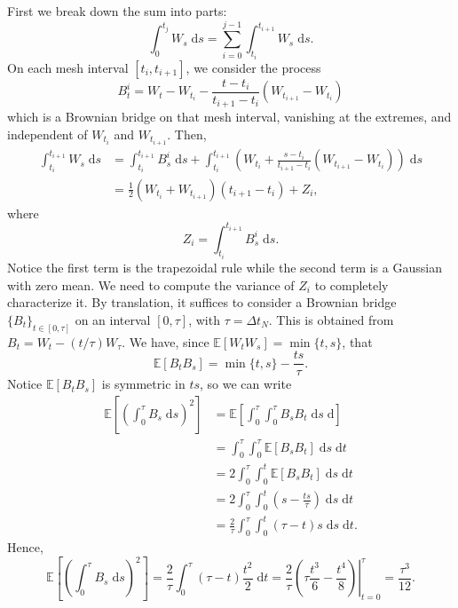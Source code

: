 \documentclass[reqno,12pt]{amsart}
\theoremstyle{plain}%
\theoremstyle{definition}
\begin{document}
First we break down the sum into parts:
\begin{equation}
    \int_0^{t_j} W_s\;\mathrm{d}s = \sum_{i = 0}^{j-1} \int_{t_i}^{t_{i+1}} W_s\;\mathrm{d}s.
\end{equation}
On each mesh interval $[t_i, t_{i+1}]$, we consider the process
\begin{equation}
    B_t^i = W_t - W_{t_i} - \frac{t - t_i}{t_{i+1}-t_i}(W_{t_{i+1}} - W_{t_i})
\end{equation}
which is a Brownian bridge on that mesh interval, vanishing at the extremes, and  independent of $W_{t_i}$ and $W_{t_{i+1}}$. Then,
\begin{align*}
    \int_{t_i}^{t_{i+1}} W_s\;\mathrm{d}s & = \int_{t_i}^{t_{i+1}} B_s^i\;\mathrm{d}s + \int_{t_i}^{t_{i+1}} \left( W_{t_i} + \frac{s - t_i}{t_{i+1}-t_i}(W_{t_{i+1}} - W_{t_i})\right)\;\mathrm{d}s \\
    & = \frac{1}{2}\left(W_{t_i} + W_{t_{i+1}}\right)(t_{i+1} - t_i) + Z_i,
\end{align*}
where
\begin{equation}
    Z_i = \int_{t_i}^{t_{i+1}} B_s^i\;\mathrm{d}s.
\end{equation}
Notice the first term is the trapezoidal rule while the second term is a Gaussian with zero mean. We need to compute the variance of $Z_i$ to completely characterize it. By translation, it suffices to consider a Brownian bridge $\{B_t\}_{t\in [0, \tau]}$ on an interval $[0, \tau]$, with $\tau = \Delta t_N$. This is obtained from $B_t = W_t - (t/\tau)W_\tau$. We have, since $\mathbb{E}[W_tW_s] = \min\{t, s\}$, that
\[
    \mathbb{E}[B_tB_s] = \min\{t, s\} - \frac{ts}{\tau}.
\]
Notice $\mathbb{E}[B_tB_s]$ is symmetric in $ts$, so we can write
\begin{align*}
    \mathbb{E}\left[\left(\int_0^{\tau} B_s\;\mathrm{d}s\right)^2\right] & = \mathbb{E}\left[\int_0^{\tau} \int_0^\tau B_sB_t\;\mathrm{d}s\;\mathrm{d}\right] \\
    & = \int_0^\tau \int_0^\tau \mathbb{E}[B_sB_t] \;\mathrm{d}s\;\mathrm{d}t \\
    & = 2\int_0^\tau \int_0^t \mathbb{E}[B_sB_t] \;\mathrm{d}s\;\mathrm{d}t \\
    & = 2\int_0^\tau \int_0^t \left(s - \frac{ts}{\tau}\right)\;\mathrm{d}s\;\mathrm{d}t \\
    & = \frac{2}{\tau}\int_0^\tau \int_0^t (\tau - t)s\;\mathrm{d}s\;\mathrm{d}t.
\end{align*}
Hence,
\begin{equation*}
    \mathbb{E}\left[\left(\int_0^{\tau} B_s\;\mathrm{d}s\right)^2\right] = \frac{2}{\tau}\int_0^\tau (\tau - t)\frac{t^2}{2}\;\mathrm{d}t = \frac{2}{\tau}\left.\left(\tau\frac{t^3}{6} - \frac{t^4}{8}\right)\right|_{t = 0}^\tau = \frac{\tau^3}{12}.
\end{equation*}
\end{document}
